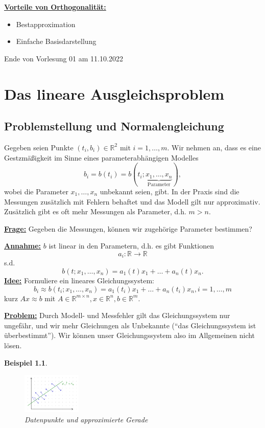 \documentclass{book}
\newtheorem{example}[algorithm]{Beispiel}
\def\R{\mathbb{R}}
\begin{document}
            \underline{\textbf{Vorteile von Orthogonalität:}}
            \begin{itemize}
                \item Bestapproximation
                \item Einfache Basisdarstellung
            \end{itemize}

        \noindent
        \xrfill[0.7ex]{1pt}Ende von Vorlesung 01 am 11.10.2022\xrfill[0.7ex]{1pt}

    \chapter{Das lineare Ausgleichsproblem}

        \section{Problemstellung und Normalengleichung}

            Gegeben seien Punkte $(t_i,b_i)\in\R^2$ mit $i=1,\dots,m$. Wir nehmen an, dass es eine Gestzmäßigkeit im Sinne eines
            parameterabhängigen Modelles 
            \[
                b_i=b(t_i)=b(t_i;\underbrace{x_1,\dots,x_n}_{\text{Parameter}}),
            \]
            wobei die Parameter $x_1,\dots,x_n$ unbekannt seien, gibt. In der Praxis sind die Messungen zusätzlich mit Fehlern
            behaftet und das Modell gilt nur approximativ. Zusätzlich gibt es oft mehr Messungen als Parameter, d.h. $m>n$.

            \underline{\textbf{Frage:}} Gegeben die Messungen, können wir zugehörige Parameter bestimmen?

            \underline{\textbf{Annahme:}} $b$ ist linear in den Parametern, d.h. es gibt Funktionen 
            \[a_i:\R\to\R\]
            s.d.
            \[b(t;x_1,\dots,x_n)=a_1(t)x_1+\dots+a_n(t)x_n.\]
            \underline{\textbf{Idee:}} Formuliere ein lineares Gleichungssystem:
            \[b_i \approx b(t_i;x_1,\dots,x_n)=a_1(t_i)x_1+\dots+a_n(t_i)x_n, i=1,\dots,m\]
            kurz $Ax\approx b$ mit $A\in\R^{m\times n},x\in\R^n,b\in\R^m$.

            \underline{\textbf{Problem:}} Durch Modell- und Messfehler gilt das Gleichungssystem nur ungefähr, und wir 
            mehr Gleichungen als Unbekannte (``das Gleichungssystem ist überbestimmt''). Wir können unser Gleichungssystem 
            also im Allgemeinen nicht lösen.

            \begin{example}\label{b2.1}
                \begin{figure}[H]
                    \centering
                    \includegraphics[width=0.25\textwidth]{Bild002}
                    \caption{Datenpunkte und approximierte Gerade}
                \end{figure}
            \end{example}
\end{document}
